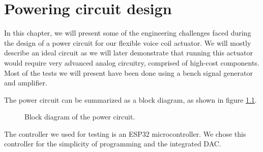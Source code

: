
\chapter{Powering circuit design} %
\label{Chapter4}
In this chapter, we will present some of the engineering challenges faced during the design of a power circuit for our flexible voice coil actuator.
We will mostly describe an ideal circuit as we will later demonstrate that running this actuator would require very advanced analog circuitry, comprised of high-cost components.
Most of the tests we will present have been done using a bench signal generator and amplifier.


The power circuit can be summarized as a block diagram, as shown in figure \ref{fig:Power_Circuit_Block_Diagram}.
\begin{figure}[H]
    \centering
    \caption{Block diagram of the power circuit.}
    \label{fig:Power_Circuit_Block_Diagram}    
\end{figure}


The controller we used for testing is an ESP32 microcontroller.
We chose this controller for the simplicity of programming and the integrated DAC.







